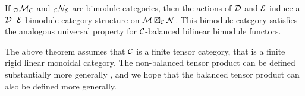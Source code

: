\documentclass{amsart}
\begin{document}
\begin{remark}
	If ${}_{\mathcal D}\mathcal M_{\mathcal C}$ and ${}_{\mathcal C}\mathcal N_{\mathcal E}$ are bimodule categories, then the actions of $\mathcal D$ and $\mathcal E$ induce a $\mathcal D$--$\mathcal E$-bimodule category structure on $\mathcal M \boxtimes_{\mathcal C} \mathcal N$. This bimodule category satisfies the analogous universal property for $\mathcal C$-balanced bilinear bimodule functors.
\end{remark}

\begin{remark}
The above theorem assumes that $\mathcal C$ is a finite tensor category, that is a finite rigid linear monoidal category.  The non-balanced tensor product can be defined substantially more generally \cite{1212.1545}, and we hope that the balanced tensor product can also be defined more generally.
\end{remark}





\end{document}

